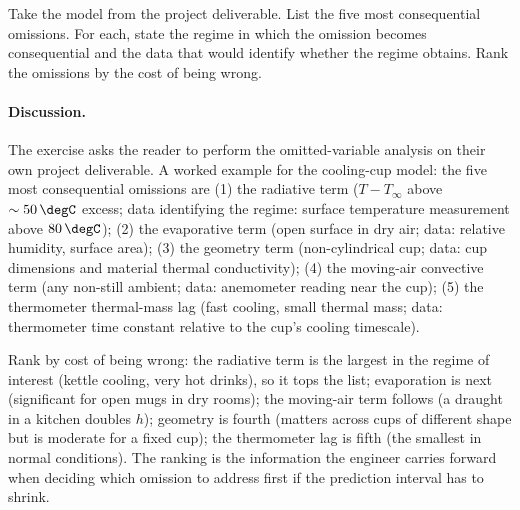 \begin{exercise}
Take the model from the project deliverable. List the five
most consequential omissions. For each, state the regime in
which the omission becomes consequential and the data that
would identify whether the regime obtains. Rank the omissions
by the cost of being wrong.

\paragraph{Discussion.} The exercise asks the reader to perform
the omitted-variable analysis on their own project deliverable. A
worked example for the cooling-cup model: the five most consequential
omissions are (1) the radiative term ($T - T_{\infty}$ above
$\sim 50\,\degC$ excess; data identifying the regime: surface
temperature measurement above $80\,\degC$); (2) the evaporative term
(open surface in dry air; data: relative humidity, surface area);
(3) the geometry term (non-cylindrical cup; data: cup dimensions
and material thermal conductivity); (4) the moving-air convective
term (any non-still ambient; data: anemometer reading near the
cup); (5) the thermometer thermal-mass lag (fast cooling, small
thermal mass; data: thermometer time constant relative to the
cup's cooling timescale).

Rank by cost of being wrong: the radiative term is the largest in
the regime of interest (kettle cooling, very hot drinks), so it
tops the list; evaporation is next (significant for open mugs in
dry rooms); the moving-air term follows (a draught in a kitchen
doubles $h$); geometry is fourth (matters across cups of different
shape but is moderate for a fixed cup); the thermometer lag is
fifth (the smallest in normal conditions). The ranking is the
information the engineer carries forward when deciding which
omission to address first if the prediction interval has to
shrink.
\end{exercise}

